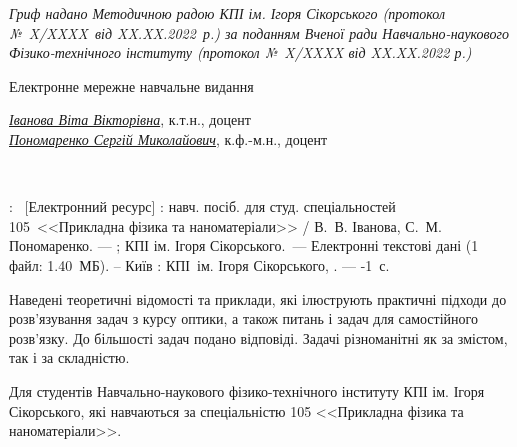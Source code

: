{\begin{alwayssingle}
		\begin{center}\itshape\small
				Гриф надано Методичною радою КПІ ім. Ігоря Сікорського (протокол №~X/XXXX~від XX.XX.2022~р.) за поданням Вченої ради Навчально-наукового Фізико-технічного інституту (протокол №~X/XXXX від XX.XX.2022 р.)
		\end{center}
		\begin{center}
			\ifelectronic Електронне мережне навчальне видання \fi
		\end{center}
		\begin{center}
			\href{https://apd.ipt.kpi.ua/blog/author/11}{\itshape Іванова Віта Вікторівна}, к.т.н., доцент \\
			\href{https://apd.ipt.kpi.ua/blog/author/183}{\itshape Пономаренко Сергій Миколайович}, к.ф.-м.н., доцент
		\end{center}
		\begin{center}\bfseries
			\LARGE\sffamily\realtitle \\
			\Large\sffamily\subtitletypeset
		\end{center}
        \begin{center}
            \editiontypeset
        \end{center}
        \noindent%
        \begin{minipage}[t]{\textwidth}\small
                \realtitle: \subtitletypeset\ [Електронний ресурс] : навч. посіб. для студ. спеціальностей
                105 <<Прикладна фізика та наноматеріали>> /  В.~В. Іванова, С.~М. Пономаренко. --- \editiontypeset ; КПІ ім. Ігоря Сікорського.~--- Електронні текстові дані
            (1 файл: 1.40~МБ). – Київ : КПІ ім. Ігоря Сікорського, \the\year. --- \the\numexpr{}-1\relax~с.
        \end{minipage}


		\vfill


        Наведені теоретичні відомості та приклади, які ілюструють практичні підходи до розв'язування задач з курсу оптики, а також  питань і задач для самостійного розв’язку.  До більшості задач подано відповіді. Задачі різноманітні як за змістом, так і за складністю.

        Для студентів Навчально-наукового фізико-технічного інституту КПІ ім. Ігоря Сікорського, які навчаються за спеціальністю 105 <<Прикладна фізика та наноматеріали>>.


\end{alwayssingle}}
